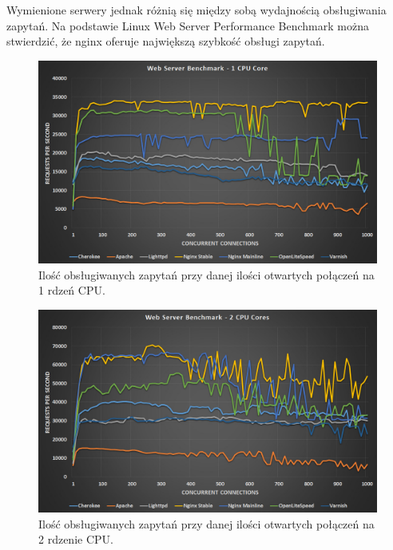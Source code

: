 \documentclass[eng]{mgr}
\begin{document}
			Wymienione serwery jednak różnią się między sobą wydajnością obsługiwania zapytań. Na podstawie Linux Web Server Performance Benchmark \cite{webserverbenchmark} można stwierdzić, że nginx oferuje największą szybkość obsługi zapytań.
	
			\begin{center}
				\begin{figure}[ht]
					\centering
					\includegraphics[scale=0.35]{web-server-performance-benchmark-1-cpu-core-1.jpg}
					\caption{Ilość obsługiwanych zapytań przy danej ilości otwartych połączeń na 1 rdzeń CPU. \cite{webserverbenchmark}}
				\end{figure}
			\end{center}

			\begin{center}
				\begin{figure}[ht]
					\centering
					\includegraphics[scale=0.35]{web-server-performance-benchmark-2-cpu-cores-2.jpg}
					\caption{Ilość obsługiwanych zapytań przy danej ilości otwartych połączeń na 2 rdzenie CPU. \cite{webserverbenchmark}}
				\end{figure}
			\end{center}
		
\end{document}
